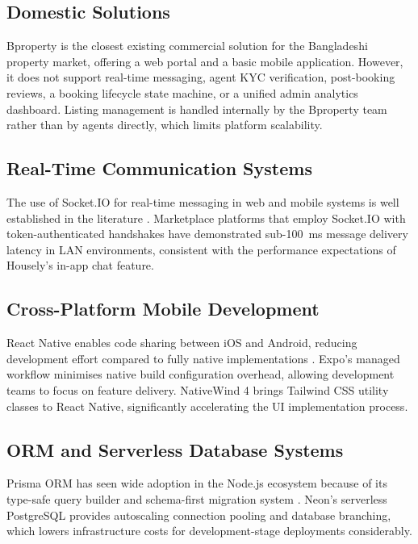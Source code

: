 \documentclass[12pt,a4paper]{report}
\begin{document}
\subsection{Domestic Solutions}

Bproperty is the closest existing commercial solution for the Bangladeshi property market,
offering a web portal and a basic mobile application. However, it does not support
real-time messaging, agent KYC verification, post-booking reviews, a booking lifecycle
state machine, or a unified admin analytics dashboard. Listing management is handled
internally by the Bproperty team rather than by agents directly, which limits platform
scalability.

\subsection{Real-Time Communication Systems}

The use of Socket.IO for real-time messaging in web and mobile systems is well established
in the literature \cite{brown2015}. Marketplace platforms that employ Socket.IO with
token-authenticated handshakes have demonstrated sub-100~ms message delivery latency
in LAN environments, consistent with the performance expectations of Housely's in-app
chat feature.

\subsection{Cross-Platform Mobile Development}

React Native enables code sharing between iOS and Android, reducing development effort
compared to fully native implementations \cite{eisenman2015}. Expo's managed workflow
minimises native build configuration overhead, allowing development teams to focus on
feature delivery. NativeWind 4 brings Tailwind CSS utility classes to React Native,
significantly accelerating the UI implementation process.

\subsection{ORM and Serverless Database Systems}

Prisma ORM has seen wide adoption in the Node.js ecosystem because of its type-safe
query builder and schema-first migration system \cite{prisma2023}. Neon's serverless
PostgreSQL provides autoscaling connection pooling and database branching, which lowers
infrastructure costs for development-stage deployments considerably.
\end{document}
